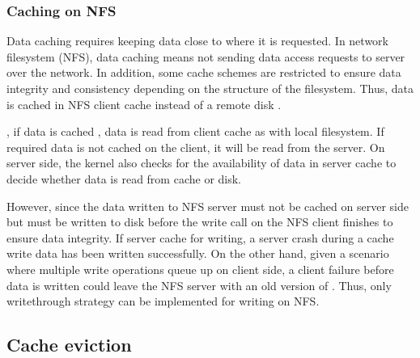 \subsubsection{Caching on NFS}


Data caching requires keeping data close to where it is requested. 
In network filesystem (NFS), data caching means not sending data access 
requests to server over the network. 
In addition, some cache schemes are restricted to ensure data integrity and 
consistency depending on the structure of the filesystem.
Thus, data is cached in NFS client cache instead of a remote disk 
\cite{eisler2001managing}. 

, if data is cached , data is read from client cache 
as with local filesystem. If required data is not cached on the client, 
it will be read from the server. On server side, the kernel also checks for the 
availability of data in server cache to decide whether data is read from 
cache or disk. 

However,  since the data written to 
NFS server must not be cached on server side but must be written to 
disk before the write call on the NFS client finishes to ensure data integrity. 
If server cache  for writing, a server crash during a cache 
write  
data has been written successfully. 
On the other hand, given a scenario where multiple write operations 
queue up on client side, a client failure before data is written could leave 
the NFS server with an old version of . 
Thus, only writethrough strategy can be implemented  for writing on NFS. 

\subsection{Cache eviction}

